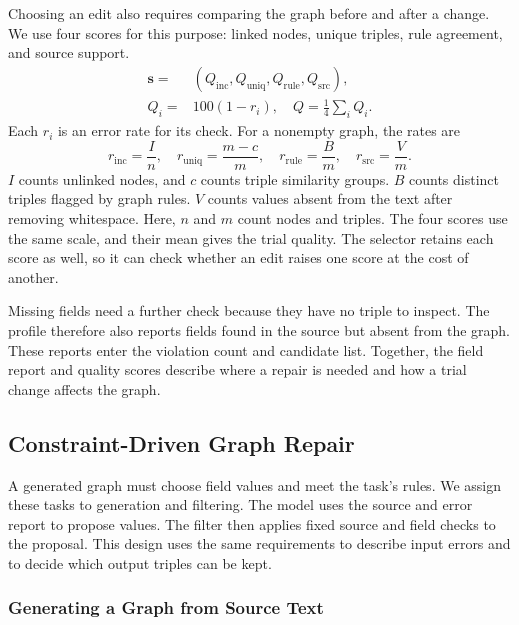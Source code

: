 Choosing an edit also requires comparing the graph before and after a change.
We use four scores for this purpose: linked nodes, unique triples,
rule agreement, and source support.
\begin{equation}
\label{eq:quality_state}
\begin{split}
\mathbf{s}={}&(Q_{\mathrm{inc}},Q_{\mathrm{uniq}},Q_{\mathrm{rule}},Q_{\mathrm{src}}),\\
Q_i={}&100(1-r_i),\quad Q=\tfrac14\sum_i Q_i.
\end{split}
\end{equation}
Each $r_i$ is an error rate for its check.
For a nonempty graph, the rates are
\begin{equation}
\label{eq:profile_rates}
r_{\mathrm{inc}}=\frac{I}{n},\quad
r_{\mathrm{uniq}}=\frac{m-c}{m},\quad
r_{\mathrm{rule}}=\frac{B}{m},\quad
r_{\mathrm{src}}=\frac{V}{m}.
\end{equation}
$I$ counts unlinked nodes, and $c$ counts triple similarity groups.
$B$ counts distinct triples flagged by graph rules.
$V$ counts values absent from the text after removing whitespace.
Here, $n$ and $m$ count nodes and triples.
The four scores use the same scale, and their mean gives the trial quality.
The selector retains each score as well, so it can check whether an edit
raises one score at the cost of another.

Missing fields need a further check because they have no triple to inspect.
The profile therefore also reports fields found in the source but absent
from the graph. These reports enter the violation count and candidate list.
Together, the field report and quality scores describe where a repair is
needed and how a trial change affects the graph.

\subsection{Constraint-Driven Graph Repair}

A generated graph must choose field values and meet the task's rules.
We assign these tasks to generation and filtering.
The model uses the source and error report to propose values.
The filter then applies fixed source and field checks to the proposal.
This design uses the same requirements to describe input errors and to
decide which output triples can be kept.

\subsubsection{Generating a Graph from Source Text}
\label{sec:framework:architecture}

